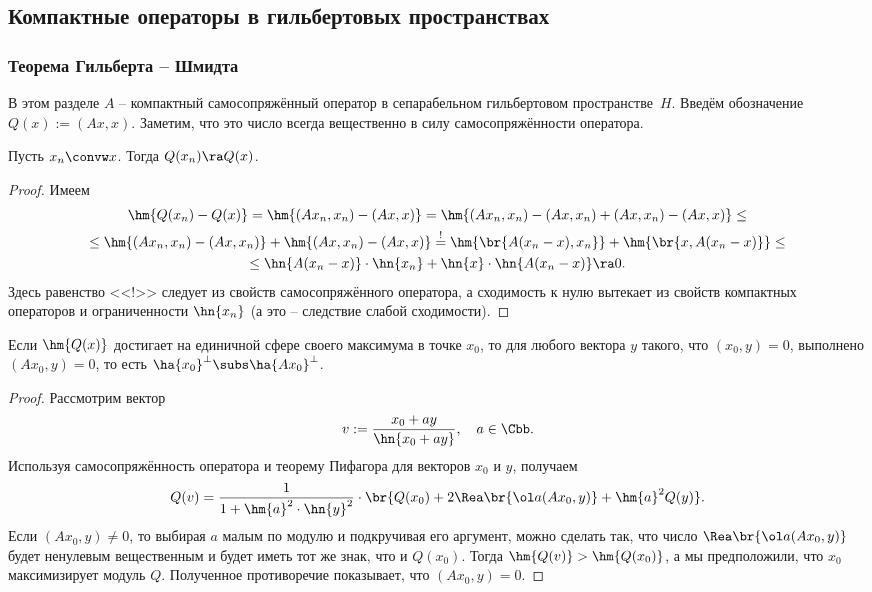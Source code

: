 \documentclass[a4paper]{article}
\begin{document}
\subsection{Компактные операторы в гильбертовых пространствах}

\subsubsection{Теорема Гильберта -- Шмидта}

В этом разделе $A$ -- компактный самосопряжённый оператор в сепарабельном гильбертовом пространстве~$H$.
Введём обозначение $Q(x) := (Ax,x)$. Заметим, что это число всегда вещественно в силу самосопряжённости
оператора.

\begin{lemma}
Пусть $x_n \convw x$. Тогда $Q(x_n) \ra Q(x)$.
\end{lemma}
\begin{proof}
Имеем
\begin{multline*}
\hm{Q(x_n) - Q(x)} = \hm{(A x_n,x_n) - (Ax,x)} = \hm{(Ax_n, x_n) - (Ax,x_n) + (Ax, x_n) - (Ax,x)} \le\\ \le
\hm{(Ax_n, x_n) - (Ax, x_n)} + \hm{(Ax, x_n) - (Ax, x)} \stackrel{!}{=}
\hm{\br{A(x_n-x), x_n}} + \hm{\br{x, A(x_n-x)}} \le \\ \le \hn{A(x_n-x)}\cdot\hn{x_n} + \hn{x}\cdot\hn{A(x_n-x)} \ra 0.
\end{multline*}
Здесь равенство <<!>> следует из свойств самосопряжённого оператора, а сходимость к нулю вытекает из свойств
компактных операторов и ограниченности $\hn{x_n}$ (а это -- следствие слабой сходимости).
\end{proof}

\begin{lemma}
Если $\hm{Q(x)}$ достигает на единичной сфере своего максимума в точке $x_0$,
то для любого вектора $y$ такого, что $(x_0,y) = 0$, выполнено $(Ax_0, y) = 0$,
то есть $\ha{x_0}^\bot \subs \ha{Ax_0}^\bot$.
\end{lemma}
\begin{proof}
Рассмотрим вектор
$$v := \frac{x_0 + ay}{\hn{x_0 + ay}}, \quad a \in \Cbb.$$
Используя самосопряжённость оператора и теорему Пифагора для векторов $x_0$ и $y$, получаем
$$Q(v) = \frac{1}{1 + \hm{a}^2\cdot\hn{y}^2}\cdot\br{ Q(x_0) + 2\Rea\br{\ol a(Ax_0,y)} + \hm{a}^2Q(y)}.$$
Если $(Ax_0,y) \neq 0$, то выбирая $a$ малым по модулю и подкручивая его аргумент, можно сделать так,
что число $\Rea\br{\ol a(Ax_0,y)}$ будет ненулевым вещественным и будет иметь тот же знак, что и $Q(x_0)$.
Тогда $\hm{Q(v)} > \hm{Q(x_0)}$, а мы предположили, что $x_0$ максимизирует модуль $Q$. Полученное
противоречие показывает, что $(Ax_0,y) = 0$.
\end{proof}
\end{document}
